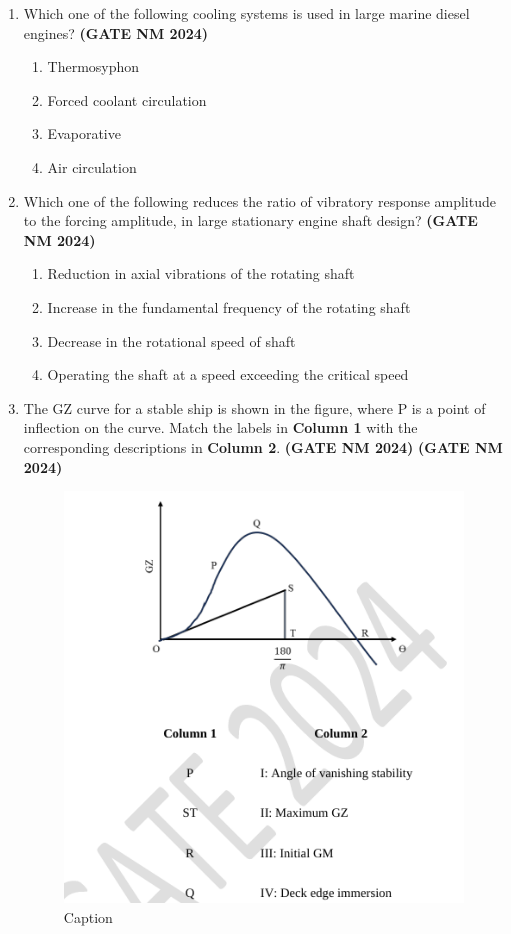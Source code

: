 \documentclass[journal,15pt,onecolumn]{IEEEtran}
\theoremstyle{remark}
\begin{document}
\begin{enumerate}
    \item Which one of the following cooling systems is used in large marine diesel engines?\hfill \textbf{ (GATE NM 2024)}

    \begin{enumerate}
        \item Thermosyphon
        \item Forced coolant circulation
        \item Evaporative
        \item Air circulation
    \end{enumerate}

 \item Which one of the following reduces the ratio of vibratory response amplitude to the forcing amplitude, in large stationary engine shaft design?\hfill \textbf{ (GATE NM 2024)}

    \begin{enumerate}
        \item Reduction in axial vibrations of the rotating shaft
        \item Increase in the fundamental frequency of the rotating shaft
        \item Decrease in the rotational speed of shaft
        \item Operating the shaft at a speed exceeding the critical speed
    \end{enumerate}


 \item
 The GZ curve for a stable ship is shown in the figure, where P is a point of inflection on the curve. Match the labels in \textbf{Column 1} with the corresponding descriptions in \textbf{Column 2}.\hfill \textbf{ (GATE NM 2024)}\hfill \textbf{ (GATE NM 2024)}

\begin{figure} [h!]
    \centering
    \includegraphics[width=0.8\linewidth]{figures.tex/Screenshot 2025-08-20 153735.png}
    \caption{Caption}
    \label{fig:placeholder}
\end{figure}


\end{enumerate}
\end{document}

